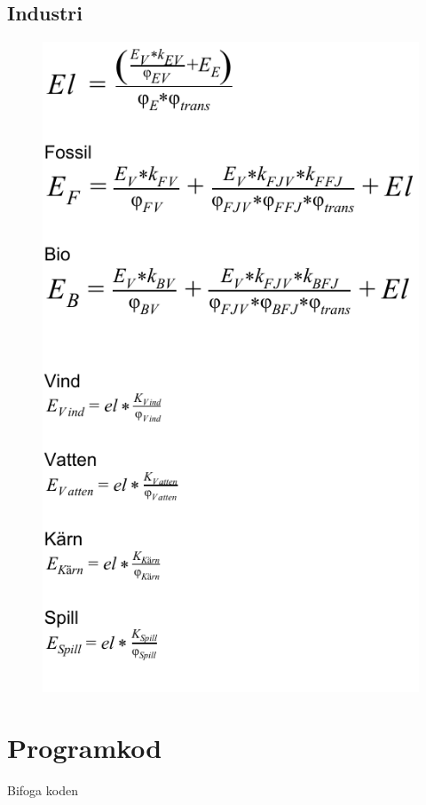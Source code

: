 \documentclass[a4paper,11pt,fleqn]{article}
\begin{document}
\subsection{Industri}
\begin{figure}[h!]
	\centering 
 		\includegraphics[scale = 0.75]{industri2.pdf}
		\label{diagram}
\end{figure}
\section{Programkod}
Bifoga koden
\end{document}
